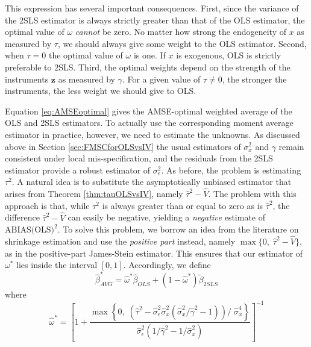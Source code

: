 This expression has several important consequences. 
First, since the variance of the 2SLS estimator is always strictly greater than that of the OLS estimator, the optimal value of $\omega$ \emph{cannot} be zero. 
No matter how strong the endogeneity of $x$ as measured by $\tau$, we should always give some weight to the OLS estimator. 
Second, when $\tau = 0$ the optimal value of $\omega$ is one. If $x$ is exogenous, OLS is strictly preferable to 2SLS. 
Third, the optimal weights depend on the strength of the instruments $\mathbf{z}$ as measured by $\gamma$. 
For a given value of $\tau\neq 0$, the stronger the instruments, the less weight we should give to OLS.

Equation \ref{eq:AMSEoptimal} gives the AMSE-optimal weighted average of the OLS and 2SLS estimators. 
To actually use the corresponding moment average estimator in practice, however, we need to estimate the unknowns.
As discussed above in Section \ref{sec:FMSCforOLSvsIV} the usual estimators of $\sigma_x^2$ and $\gamma$ remain consistent under local mis-specification, and the residuals from the 2SLS estimator provide a robust estimator of $\sigma_\epsilon^2$.
As before, the problem is estimating $\tau^2$.
A natural idea is to substitute the asymptotically unbiased estimator that arises from Theorem \ref{thm:tauOLSvsIV}, namely $\widehat{\tau}^2 - \widehat{V}$. 
The problem with this approach is that, while $\tau^2$ is always greater than or equal to zero as is $\widehat{\tau}^2$, the difference $\widehat{\tau}^2 - \widehat{V}$ can easily be negative, yielding a \emph{negative} estimate of $\mbox{ABIAS(OLS)}^2$.
To solve this problem, we borrow an idea from the literature on shrinkage estimation and use the \emph{positive part} instead, namely $\max\{0, \; \widehat{\tau}^2 - \widehat{V}\}$, as in the positive-part James-Stein estimator.
This ensures that our estimator of $\omega^*$ lies inside the interval $[0,1]$.
Accordingly, we define 
\begin{equation}
	\widehat{\beta}^*_{AVG} = \widehat{\omega}^* \widehat{\beta}_{OLS} + (1 - \widehat{\omega}^*)\widetilde{\beta}_{2SLS}
	\label{eq:OLSvsIV_AVG1}
\end{equation}
where
\begin{equation}
\widehat{\omega }^* = \left[1 + \frac{\max \left\{0, \; \left(\widehat{\tau}^2 - \widehat{\sigma}_\epsilon^2\widehat{\sigma}_x^2  \left(\widehat{\sigma}_x^2/\widehat{\gamma}^2 - 1 \right) \right)/\;\widehat{\sigma}_x^4 \right\}}{\widehat{\sigma}_\epsilon^2 (1/\widehat{\gamma}^2 - 1/\widehat{\sigma}_x^2)}\right]^{-1}
	\label{eq:OLSvsIV_AVG2}
\end{equation}

